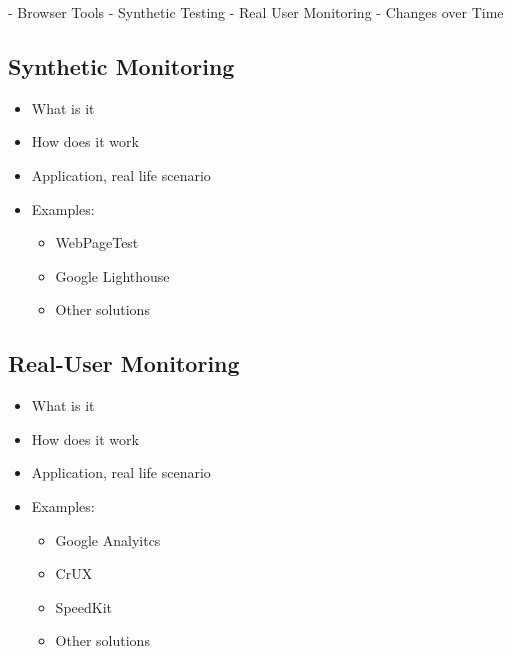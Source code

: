 - Browser Tools
- Synthetic Testing
- Real User Monitoring
- Changes over Time















\subsection{Synthetic Monitoring}

\begin{itemize}
    \item What is it
    \item How does it work
    \item Application, real life scenario
    \item Examples:
    \begin{itemize}
        \item WebPageTest
        \item Google Lighthouse
        \item Other solutions
    \end{itemize}
\end{itemize}
















\subsection{Real-User Monitoring}

\begin{itemize}
    \item What is it
    \item How does it work
    \item Application, real life scenario
    \item Examples:
    \begin{itemize}
        \item Google Analyitcs
        \item CrUX
        \item SpeedKit
        \item Other solutions
    \end{itemize}
\end{itemize}

